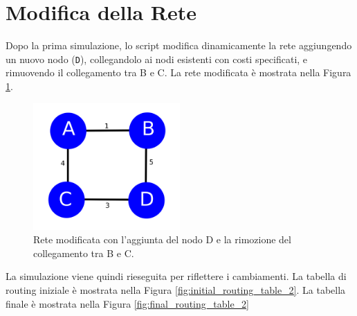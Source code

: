 \documentclass{report}
\begin{document}
\section{Modifica della Rete}
Dopo la prima simulazione, lo script modifica dinamicamente la rete aggiungendo un nuovo nodo (\texttt{D}), collegandolo ai nodi esistenti con costi specificati, e rimuovendo il collegamento tra B e C. La rete modificata è mostrata nella Figura \ref{fig:modified_network_1}.

\begin{figure}[H]
    \centering
    \includegraphics[width=0.5\textwidth]{img/img2.png}
    \caption{Rete modificata con l'aggiunta del nodo D e la rimozione del collegamento tra B e C.}
    \label{fig:modified_network_1}
\end{figure}

La simulazione viene quindi rieseguita per riflettere i cambiamenti. La tabella di routing iniziale è mostrata nella Figura \ref{fig:initial_routing_table_2}. La tabella finale è mostrata nella Figura \ref{fig:final_routing_table_2}
\end{document}
